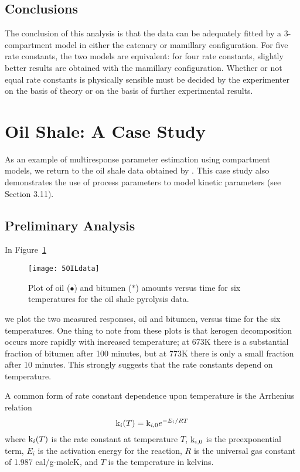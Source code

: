 \subsection{Conclusions}

The conclusion of this analysis is that the data can be
adequately fitted by a 3-compartment model in either the catenary
or mamillary configuration.
For five rate constants, the two models are equivalent:
for four rate constants, slightly better results are obtained
with the mamillary configuration.
Whether or not equal rate constants is physically sensible must
be decided by the experimenter on the basis of theory or on the
basis of further experimental results.

\section{Oil Shale: A Case Study}

As an example of multiresponse parameter estimation
using compartment models, we return to the oil shale data obtained by
.
This case study also demonstrates the use of process
parameters to model kinetic parameters (see Section 3.11).
\subsection{Preliminary Analysis}

In Figure~\ref{fig:OILdata}
\begin{figure}
  \centerline{\texttt{[image: 5OILdata]}}%
  \caption{\label{fig:OILdata}
  Plot of oil ($\bullet$) and bitumen ($*$) amounts versus time
  for six temperatures for the oil shale pyrolysis data.
  }
\end{figure}
we plot the two measured responses, oil and bitumen, versus time
for the six temperatures.
One thing to note from these plots is that kerogen decomposition
occurs more rapidly with increased temperature;
at 673K there is a substantial fraction
of bitumen after 100 minutes, but at 773K there
is only a small fraction after 10 minutes.
This strongly suggests that the rate constants depend on temperature.

A common form of rate constant dependence upon temperature
is the Arrhenius relation
\begin{displaymath}
{\rm k}_i ( T ) = {\rm k}_{i,0} 
e^{{-} E_i / R T}
\end{displaymath}
where $\mbox{\rm k}_i ( T )$ is the rate constant at temperature $T$,
$\mbox{\rm k}_{i,0}$ is the preexponential term, $E_{i}$ is the activation
energy for the reaction, $R$ is the universal gas constant of 1.987
cal/g-moleK, and $T$ is the temperature in kelvins.

